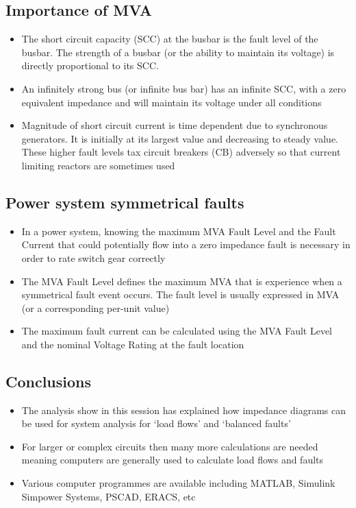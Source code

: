 \documentclass[class=report, crop=false, 12pt,a4paper]{standalone}
\begin{document}
\subsection{Importance of MVA}
\begin{itemize}
	\item The short circuit capacity (SCC) at the busbar is the fault level of the busbar. The strength of a busbar (or the ability to maintain its voltage) is directly proportional to its SCC.
	\item An infinitely strong bus (or infinite bus bar) has an infinite SCC, with a zero equivalent impedance and will maintain its voltage under all conditions
	\item Magnitude of short circuit current is time dependent due to synchronous generators. It is initially at its largest value and decreasing to steady value. These higher fault levels tax circuit breakers (CB) adversely so that current limiting reactors are sometimes used
\end{itemize}
\subsection{Power system symmetrical faults}
\begin{itemize}
	\item In a power system, knowing the maximum MVA Fault Level and the Fault Current that could potentially flow into a zero impedance fault is necessary in order to rate switch gear correctly
	\item The MVA Fault Level defines the maximum MVA that is experience when a symmetrical fault event occurs. The fault level is usually expressed in MVA (or a corresponding per-unit value)
	\item The maximum fault current can be calculated using the MVA Fault Level and the nominal Voltage Rating at the fault location
\end{itemize}
\subsection{Conclusions}
\begin{itemize}
	\item The analysis show in this session has explained how impedance diagrams can be used for system analysis for `load flows' and `balanced faults'
	\item For larger or complex circuits then many more calculations are needed meaning computers are generally used to calculate load flows and faults
	\item Various computer programmes are available including MATLAB, Simulink Simpower Systems, PSCAD, ERACS, etc
\end{itemize}
\end{document}
